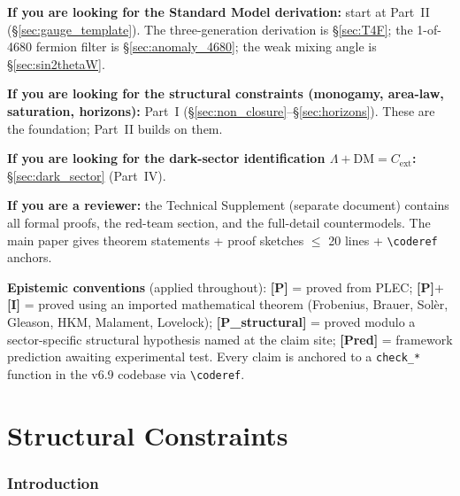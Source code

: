 \documentclass[11pt]{article}
\newcommand{\epitag}[1]{\textbf{[#1]}}
\theoremstyle{definition}
\begin{document}
\vspace{0.5em}

\begin{tcolorbox}[wayfinder, title={Wayfinder: how to read this paper}]
\textbf{If you are looking for the Standard Model derivation:} start at Part~II (\S\ref{sec:gauge_template}). The three-generation derivation is \S\ref{sec:T4F}; the 1-of-4680 fermion filter is \S\ref{sec:anomaly_4680}; the weak mixing angle is \S\ref{sec:sin2thetaW}.

\textbf{If you are looking for the structural constraints (monogamy, area-law, saturation, horizons):} Part~I (\S\ref{sec:non_closure}--\S\ref{sec:horizons}). These are the foundation; Part~II builds on them.

\textbf{If you are looking for the dark-sector identification $\Lambda + \mathrm{DM} = C_{\mathrm{ext}}$:} \S\ref{sec:dark_sector} (Part~IV).

\textbf{If you are a reviewer:} the Technical Supplement (separate document) contains all formal proofs, the red-team section, and the full-detail countermodels. The main paper gives theorem statements + proof sketches $\leq$ 20 lines + \texttt{\textbackslash coderef} anchors.

\textbf{Epistemic conventions} (applied throughout): \epitag{P} = proved from PLEC; \epitag{P}+\epitag{I} = proved using an imported mathematical theorem (Frobenius, Brauer, Solèr, Gleason, HKM, Malament, Lovelock); \epitag{P\_structural} = proved modulo a sector-specific structural hypothesis named at the claim site; \epitag{Pred} = framework prediction awaiting experimental test. Every claim is anchored to a \texttt{check\_*} function in the v6.9 codebase via \texttt{\textbackslash coderef}.
\end{tcolorbox}

\tableofcontents
\vspace{1em}
\clearpage

\part{Structural Constraints}

\section{Introduction}\label{sec:intro}
\end{document}
